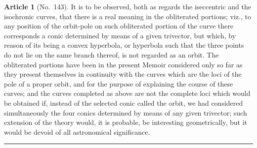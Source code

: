 \documentclass[11pt,a4paper]{article}
\theoremstyle{definition}
\newtheorem{art}{Article}
\begin{document}
\begin{art}[No.~143]
It is to be observed, both as regards the iseccentric and the isochronic curves, that there is a real meaning in the obliterated portions; viz., to any position of the orbit-pole on such obliterated portion of the curve there corresponds a conic determined by means of a given trivector, but which, by reason of its being a convex hyperbola, or hyperbola such that the three points do not lie on the same branch thereof, is not regarded as an orbit. The obliterated portions have been in the present Memoir considered only so far as they present themselves in continuity with the curves which are the loci of the pole of a proper orbit, and for the purpose of explaining the course of these curves; and the curves completed as above are not the complete loci which would be obtained if, instead of the selected conic called the orbit, we had considered simultaneously the four conics determined by means of any given trivector; such extension of the theory would, it is probable, be interesting geometrically, but it would be devoid of all astronomical significance.
\end{art}

\vspace{1em}
\begin{center}
\rule{0.5\textwidth}{0.4pt}
\end{center}
\end{document}
